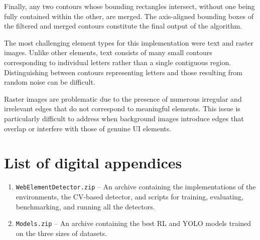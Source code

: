 \documentclass[
  digital,     %
  oneside,     %
  nosansbold,  %
  nocolorbold, %
  lof,         %
  lot,         %
]{fithesis4}
\begin{document}
Finally, any two contours whose bounding rectangles intersect, without one being fully contained within the other, are merged. The axis-aligned bounding boxes of the filtered and merged contours constitute the final output of the algorithm.

The most challenging element types for this implementation were text and raster images. Unlike other elements, text consists of many small contours corresponding to individual letters rather than a single contiguous region. Distinguishing between contours representing letters and those resulting from random noise can be difficult.

Raster images are problematic due to the presence of numerous irregular and irrelevant edges that do not correspond to meaningful elements. This issue is particularly difficult to address when background images introduce edges that overlap or interfere with those of genuine UI elements.

\chapter{List of digital appendices}

\begin{enumerate}
    \item \texttt{WebElementDetector.zip} -- An archive containing the implementations of the environments, the CV-based detector, and scripts for training, evaluating, benchmarking, and running all the detectors.
    \item \texttt{Models.zip} -- An archive containing the best RL and YOLO models trained on the three sizes of datasets.
\end{enumerate}
\end{document}
